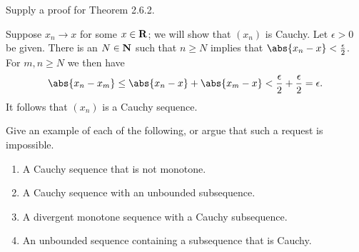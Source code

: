 \documentclass{lew98_solutions}
\begin{document}
\begin{exercise}
\label{ex:2.6.1}
    Supply a proof for Theorem 2.6.2.
\end{exercise}

\begin{solution}
    Suppose \( x_n \to x \) for some \( x \in \mathbf{R} \); we will show that \( (x_n) \) is Cauchy. Let \( \epsilon > 0 \) be given. There is an \( N \in \mathbf{N} \) such that \( n \geq N \) implies that \( \abs{x_n - x} < \tfrac{\epsilon}{2} \). For \( m, n \geq N \) we then have
    \[
        \abs{x_n - x_m} \leq \abs{x_n - x} + \abs{x_m - x} < \frac{\epsilon}{2} + \frac{\epsilon}{2} = \epsilon.
    \]
    It follows that \( (x_n) \) is a Cauchy sequence.
\end{solution}

\begin{exercise}
\label{ex:2.6.2}
    Give an example of each of the following, or argue that such a request is impossible.
    \begin{enumerate}
        \item A Cauchy sequence that is not monotone.

        \item A Cauchy sequence with an unbounded subsequence.

        \item A divergent monotone sequence with a Cauchy subsequence.

        \item An unbounded sequence containing a subsequence that is Cauchy.
    \end{enumerate}
\end{exercise}
\end{document}
